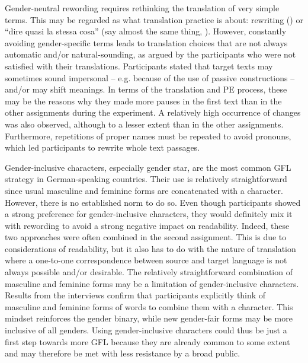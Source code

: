 Gender-neutral rewording requires rethinking the translation of very simple terms. This may be regarded as what translation practice is about: rewriting (\cite{lefevere1992translation}) or ``dire quasi la stessa cosa'' (say almost the same thing, \cite{eco2016dire}). However, constantly avoiding gender-specific terms leads to translation choices that are not always automatic and/or natural-sounding, as argued by the participants who were not satisfied with their translations. Participants stated that target texts may sometimes sound impersonal -- e.g. because of the use of passive constructions -- and/or may shift meanings. In terms of the translation and PE process, these may be the reasons why they made more pauses in the first text than in the other assignments during the experiment. A relatively high occurrence of changes was also observed, although to a lesser extent than in the other assignments. Furthermore, repetitions of proper names must be repeated to avoid pronouns, which led participants to rewrite whole text passages. 



Gender-inclusive characters, especially gender star, are the most common GFL strategy in German-speaking countries. Their use is relatively straightforward since usual masculine and feminine forms are concatenated with a character. However, there is no established norm to do so. Even though participants showed a strong preference for gender-inclusive characters, they would definitely mix it with rewording to avoid a strong negative impact on readability. Indeed, these two approaches were often combined in the second assignment. This is due to considerations of readability, but it also has to do with the nature of translation where a one-to-one correspondence between source and target language is not always possible and/or desirable. The relatively straightforward combination of masculine and feminine forms may be a limitation of gender-inclusive characters. Results from the interviews confirm that participants explicitly think of masculine and feminine forms of words to combine them with a character. This mindset reinforces the gender binary, while new gender-fair forms may be more inclusive of all genders. Using gender-inclusive characters could thus be just a first step towards more GFL because they are already common to some extent and may therefore be met with less resistance by a broad public. 

